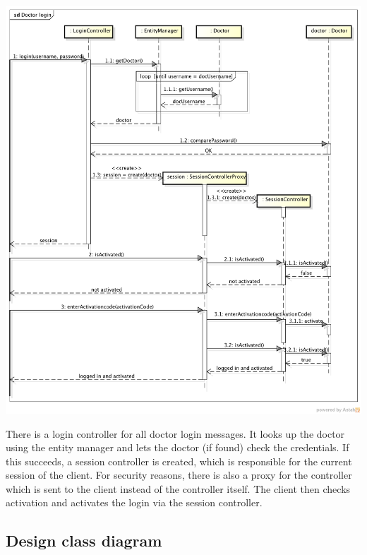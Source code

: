 \documentclass[fontsize=12pt,
               paper=a4,
               twoside=false,
               parskip=half,
               ]{scrartcl}
\begin{document}
\includegraphics[width=15cm]{./img/sequence-diagrams/doctor-login.png}

There is a login controller for all doctor login messages. It looks up the doctor using the entity manager and lets the doctor (if found) check the credentials. If this succeeds, a session controller is created, which is responsible for the current session of the client. For security reasons, there is also a proxy for the controller which is sent to the client instead of the controller itself. The client then checks activation and activates the login via the session controller.

\subsection{Design class diagram}
\end{document}
